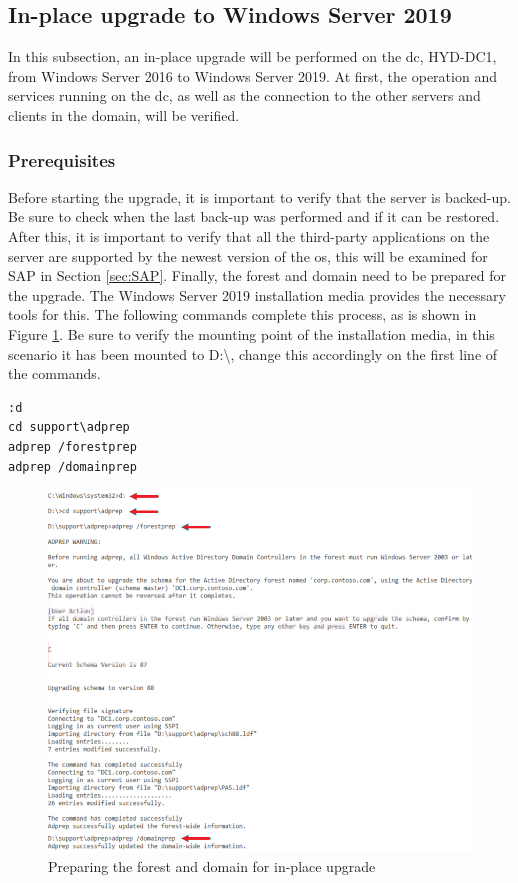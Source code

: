 \subsection{In-place upgrade to Windows Server 2019}
In this subsection, an in-place upgrade will be performed on the \acrfull{dc}, HYD-DC1, from Windows Server 2016 to Windows Server 2019. 
At first, the operation and services running on the \acrshort{dc}, as well as the connection to the other servers and clients in the domain, will be verified.
\subsubsection{Prerequisites}
Before starting the upgrade, it is important to verify that the server is backed-up. 
Be sure to check when the last back-up was performed and if it can be restored. 
After this, it is important to verify that all the third-party applications on the server are supported by the newest version of the \acrshort{os}, this will be examined for SAP in Section \ref{sec:SAP}. 
Finally, the forest and domain need to be prepared for the upgrade. 
The Windows Server 2019 installation media provides the necessary tools for this. 
The following commands complete this process, as is shown in Figure \ref{fig:Prerequisites}. 
Be sure to verify the mounting point of the installation media, in this scenario it has been mounted to D:\textbackslash{}, change this accordingly on the first line of the commands.

\begin{lstlisting}[breaklines]
:d
cd support\adprep
adprep /forestprep
adprep /domainprep
\end{lstlisting}

\begin{figure}[h]
	\includegraphics[width=\linewidth]{img/Methodologie/Prerequisites0.png}
	\captionsetup{width=0.9\linewidth}
	\centering		
	\caption[Preparing forest and domain ]{Preparing the forest and domain for in-place upgrade}
	\label{fig:Prerequisites}
\end{figure}
\clearpage

